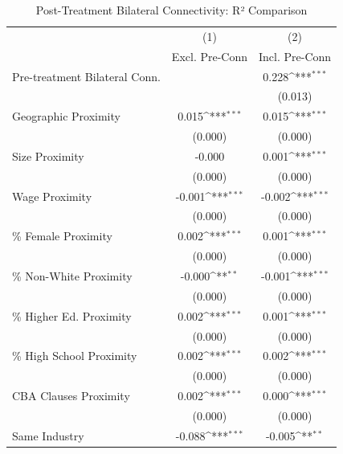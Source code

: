 \begin{table}[htbp]\centering
\def\sym#1{\ifmmode^{#1}\else\(^{#1}\)\fi}
\caption{Post-Treatment Bilateral Connectivity: R² Comparison}
\begin{tabular}{l*{2}{c}}
\toprule
                    &\multicolumn{1}{c}{(1)}&\multicolumn{1}{c}{(2)}\\
                    &\multicolumn{1}{c}{Excl. Pre-Conn}&\multicolumn{1}{c}{Incl. Pre-Conn}\\
\midrule
Pre-treatment Bilateral Conn.&                     &       0.228\sym{***}\\
                    &                     &     (0.013)         \\
\addlinespace
Geographic Proximity&       0.015\sym{***}&       0.015\sym{***}\\
                    &     (0.000)         &     (0.000)         \\
\addlinespace
Size Proximity      &      -0.000         &       0.001\sym{***}\\
                    &     (0.000)         &     (0.000)         \\
\addlinespace
Wage Proximity      &      -0.001\sym{***}&      -0.002\sym{***}\\
                    &     (0.000)         &     (0.000)         \\
\addlinespace
\% Female Proximity &       0.002\sym{***}&       0.001\sym{***}\\
                    &     (0.000)         &     (0.000)         \\
\addlinespace
\% Non-White Proximity&      -0.000\sym{**} &      -0.001\sym{***}\\
                    &     (0.000)         &     (0.000)         \\
\addlinespace
\% Higher Ed. Proximity&       0.002\sym{***}&       0.001\sym{***}\\
                    &     (0.000)         &     (0.000)         \\
\addlinespace
\% High School Proximity&       0.002\sym{***}&       0.002\sym{***}\\
                    &     (0.000)         &     (0.000)         \\
\addlinespace
CBA Clauses Proximity&       0.002\sym{***}&       0.000\sym{***}\\
                    &     (0.000)         &     (0.000)         \\
\addlinespace
Same Industry       &      -0.088\sym{***}&      -0.005\sym{**} \\

\end{tabular}
\end{table}
